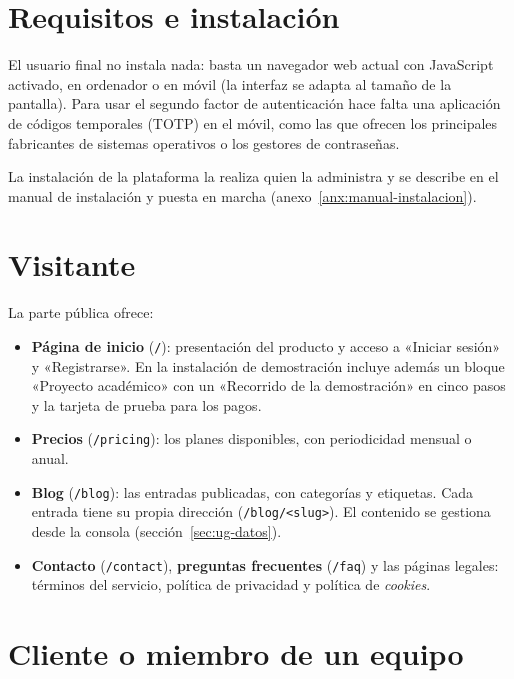 \section{Requisitos e instalación}
\label{sec:ug-requisitos}

El usuario final no instala nada: basta un navegador web actual con
JavaScript activado, en ordenador o en móvil (la interfaz se adapta al tamaño
de la pantalla). Para usar el segundo factor de autenticación hace falta una
aplicación de códigos temporales (TOTP) en el móvil, como las que ofrecen los
principales fabricantes de sistemas operativos o los gestores de contraseñas.

La instalación de la plataforma la realiza quien la administra y se
describe en el manual de instalación y puesta en marcha
(anexo~\ref{anx:manual-instalacion}).

\section{Visitante}
\label{sec:ug-visitante}

La parte pública ofrece:

\begin{itemize}
  \item \textbf{Página de inicio} (\texttt{/}): presentación del producto y
        acceso a «Iniciar sesión» y «Registrarse». En la instalación de
        demostración incluye además un bloque «Proyecto académico» con un
        «Recorrido de la demostración» en cinco pasos y la tarjeta de prueba
        para los pagos.
  \item \textbf{Precios} (\texttt{/pricing}): los planes disponibles, con
        periodicidad mensual o anual.
  \item \textbf{Blog} (\texttt{/blog}): las entradas publicadas, con
        categorías y etiquetas. Cada entrada tiene su propia dirección
        (\texttt{/blog/<slug>}). El contenido se gestiona desde la consola
        (sección~\ref{sec:ug-datos}).
  \item \textbf{Contacto} (\texttt{/contact}), \textbf{preguntas frecuentes}
        (\texttt{/faq}) y las páginas legales: términos del servicio,
        política de privacidad y política de \textit{cookies}.
\end{itemize}

\section{Cliente o miembro de un equipo}
\label{sec:ug-cliente}

